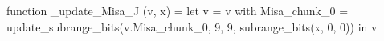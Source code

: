 function _update_Misa_J (v, x) = let v = { v with Misa_chunk_0 = update_subrange_bits(v.Misa_chunk_0, 9, 9, subrange_bits(x, 0, 0)) } in
  v
